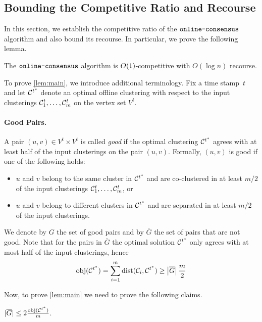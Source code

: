 \subsection{Bounding the Competitive Ratio and Recourse}

In this section, we establish the competitive ratio of the $\texttt{online-consensus}$ algorithm and also bound its recourse.
In particular, we prove the following lemma.

\begin{lemma}\label{lem:main}
    The $\texttt{online-consensus}$ algorithm is $O(1)$-competitive with $O(\log n)$ recourse.
\end{lemma}

To prove \cref{lem:main}, we introduce additional terminology.
Fix a time stamp~$t$ and let $\mathcal{C}^{t^*}$ denote an optimal offline clustering with respect to the input clusterings
$\mathcal{C}_1^t, \ldots, \mathcal{C}_m^t$ on the vertex set $V^t$.

\paragraph{Good Pairs.}
A pair $(u,v) \in V^t \times V^t$ is called \emph{good} if the optimal clustering $\mathcal{C}^{t^*}$ agrees with at least half of the input clusterings on the pair $(u,v)$.
Formally, $(u,v)$ is good if one of the following holds:
\begin{itemize}
    \item $u$ and $v$ belong to the same cluster in $\mathcal{C}^{t^*}$ and are co-clustered in at least $m/2$ of the input clusterings $\mathcal{C}_1^t, \ldots, \mathcal{C}_m^t$, or
    \item $u$ and $v$ belong to different clusters in $\mathcal{C}^{t^*}$ and are separated in at least $m/2$ of the input clusterings.
\end{itemize}

We denote by $G$ the set of good pairs and by $\overline{G}$ the set of pairs that are not good. Note that for the pairs in $\overline{G}$ the optimal solution $\mathcal{C}^{t^*}$ only agrees with at most half of the input clusterings, hence
\[
    \text{obj}(\mathcal{C}^{t^*}) = \sum_{i = 1}^m \text{dist}(\mathcal{C}_i, \mathcal{C}^{t^*}) \geq \left| \overline{G} \right| \frac{m}{2}
\]

Now, to prove \cref{lem:main} we need to prove the following claims.

\begin{claim}\label{clm:bounding-bad-pairs}
    $|\overline{G}| \leq 2 \frac{\text{obj}(\mathcal{C}^{t^*})}{m}$.
\end{claim}

